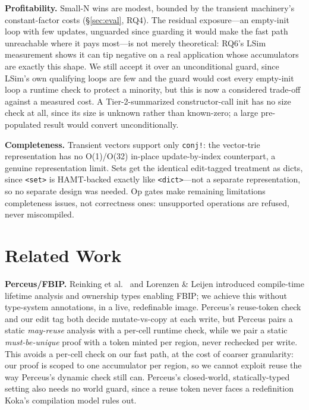 \documentclass[sigplan,review,anonymous]{acmart}
\begin{document}
\textbf{Profitability.} Small-N wins are modest, bounded by the transient machinery's constant-factor costs (§\ref{sec:eval}, RQ4). The residual exposure---an empty-init loop with few updates, unguarded since guarding it would make the fast path unreachable where it pays most---is not merely theoretical: RQ6's LSim measurement shows it can tip negative on a real application whose accumulators are exactly this shape. We still accept it over an unconditional guard, since LSim's own qualifying loops are few and the guard would cost every empty-init loop a runtime check to protect a minority, but this is now a considered trade-off against a measured cost. A Tier-2-summarized constructor-call init has no size check at all, since its size is unknown rather than known-zero; a large pre-populated result would convert unconditionally.

\textbf{Completeness.} Transient vectors support only \texttt{conj!}: the vector-trie representation has no O(1)/O(32) in-place update-by-index counterpart, a genuine representation limit. Sets get the identical edit-tagged treatment as dicts, since \texttt{<set>} is HAMT-backed exactly like \texttt{<dict>}---not a separate representation, so no separate design was needed. Op gates make remaining limitations completeness issues, not correctness ones: unsupported operations are refused, never miscompiled.

\section{Related Work}
\label{sec:related}
\textbf{Perceus/FBIP.} Reinking et al.\ \cite{reinking2021perceus} and Lorenzen \& Leijen \cite{lorenzen2023functional} introduced compile-time lifetime analysis and ownership types enabling FBIP; we achieve this without type-system annotations, in a live, redefinable image. Perceus's reuse-token check and our edit tag both decide mutate-vs-copy at each write, but Perceus pairs a static \emph{may-reuse} analysis with a per-cell runtime check, while we pair a static \emph{must-be-unique} proof with a token minted per region, never rechecked per write. This avoids a per-cell check on our fast path, at the cost of coarser granularity: our proof is scoped to one accumulator per region, so we cannot exploit reuse the way Perceus's dynamic check still can. Perceus's closed-world, statically-typed setting also needs no world guard, since a reuse token never faces a redefinition Koka's compilation model rules out.
\end{document}
